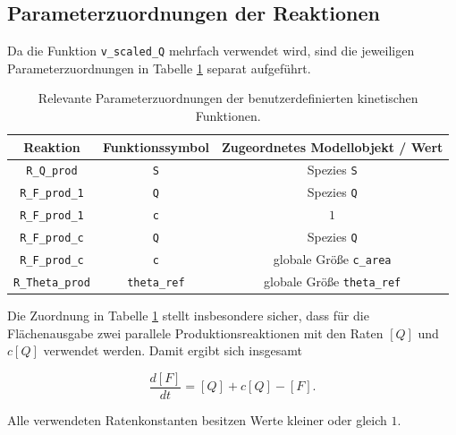 \subsection{Parameterzuordnungen der Reaktionen}

Da die Funktion \texttt{v\_scaled\_Q} mehrfach verwendet wird, sind die
jeweiligen Parameterzuordnungen in Tabelle
\ref{tab:copasi_parameter_mapping} separat aufgeführt.

\begin{table}[h]
    \centering
    \begin{tabular}{c|c|c}
        Reaktion & Funktionssymbol & Zugeordnetes Modellobjekt / Wert \\
        \hline
        \texttt{R\_Q\_prod} & \texttt{S} & Spezies \texttt{S} \\
        \texttt{R\_F\_prod\_1} & \texttt{Q} & Spezies \texttt{Q} \\
        \texttt{R\_F\_prod\_1} & \texttt{c} & \(1\) \\
        \texttt{R\_F\_prod\_c} & \texttt{Q} & Spezies \texttt{Q} \\
        \texttt{R\_F\_prod\_c} & \texttt{c} & globale Größe \texttt{c\_area} \\
        \texttt{R\_Theta\_prod} & \texttt{theta\_ref} & globale Größe \texttt{theta\_ref} \\
    \end{tabular}
    \caption{Relevante Parameterzuordnungen der benutzerdefinierten
    kinetischen Funktionen.}
    \label{tab:copasi_parameter_mapping}
\end{table}

Die Zuordnung in Tabelle \ref{tab:copasi_parameter_mapping} stellt
insbesondere sicher, dass für die Flächenausgabe zwei parallele
Produktionsreaktionen mit den Raten \([Q]\) und \(c[Q]\) verwendet werden.
Damit ergibt sich insgesamt

\[
    \frac{d[F]}{dt}
    =
    [Q]+c[Q]-[F].
\]

Alle verwendeten Ratenkonstanten besitzen Werte kleiner oder gleich \(1\).
